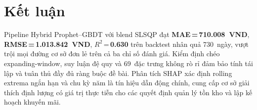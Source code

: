 \documentclass[10pt,twocolumn]{article}
\begin{document}
\section{Kết luận}

Pipeline Hybrid Prophet--GBDT với blend SLSQP đạt
\textbf{MAE\,=\,710.008~VND}, \textbf{RMSE\,=\,1.013.842~VND},
$R^2$\,=\,\textbf{0.630} trên backtest nhân quả 730~ngày, vượt trội
mọi đường cơ sở đơn lẻ trên cả ba chỉ số đánh giá. Kiểm định chéo
expanding-window, suy luận đệ quy và 69~đặc trưng không rò rỉ đảm
bảo tính tái lập và tuân thủ đầy đủ ràng buộc đề bài. Phân tích SHAP
xác định rolling extrema ngắn hạn và chu kỳ năm là tín hiệu dẫn động
chính, cung cấp cơ sở giải thích định lượng có giá trị thực tiễn cho
các quyết định quản lý tồn kho và lập kế hoạch khuyến mãi.

\vspace*{\fill}
\newpage %

\end{document}
